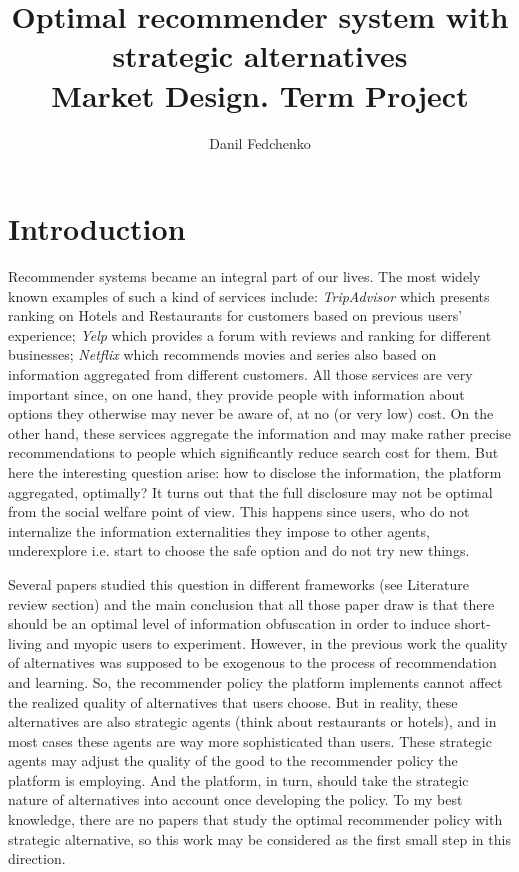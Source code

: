 \documentclass[a4paper]{article}
\title{Optimal recommender system with strategic alternatives \\ Market Design. Term Project}
\date{}
\author{Danil Fedchenko}
\begin{document}
	\maketitle
	\section{Introduction}
	Recommender systems became an integral part of our lives. The most widely known examples of such a kind of services include: \textit{TripAdvisor} which presents ranking on Hotels and Restaurants for customers based on previous users' experience; \textit{Yelp} which provides a forum with reviews and ranking for different businesses; \textit{Netflix} which recommends movies and series also based on information aggregated from different customers. All those services are very important since, on one hand, they provide people with information about options they otherwise may never be aware of, at no (or very low) cost. On the other hand, these services aggregate the information and may make rather precise recommendations to people which significantly reduce search cost for them. But here the interesting question arise: how to disclose the information, the platform aggregated, optimally? It turns out that the full disclosure may not be optimal from the social welfare point of view. This happens since users, who do not internalize the information externalities they impose to other agents, underexplore i.e. start to choose the safe option and do not try new things. 
	
	
	Several papers studied this question in different frameworks (see Literature review section) and the main conclusion that all those paper draw is that there should be an optimal level of information obfuscation in order to induce short-living and myopic users to experiment. However, in the previous work the quality of alternatives was supposed to be exogenous to the process of recommendation and learning. So, the recommender policy the platform implements cannot affect the realized quality of alternatives that users choose. But in reality, these alternatives are also strategic agents (think about restaurants or hotels), and in most cases these agents are way more sophisticated than users. These strategic agents may adjust the quality of the good to the recommender policy the platform is employing. And the platform, in turn, should take the strategic nature of alternatives into account once developing the policy. To my best knowledge, there are no papers that study the optimal recommender policy with strategic alternative, so this work may be considered as the first small step in this direction.
	
\end{document}
